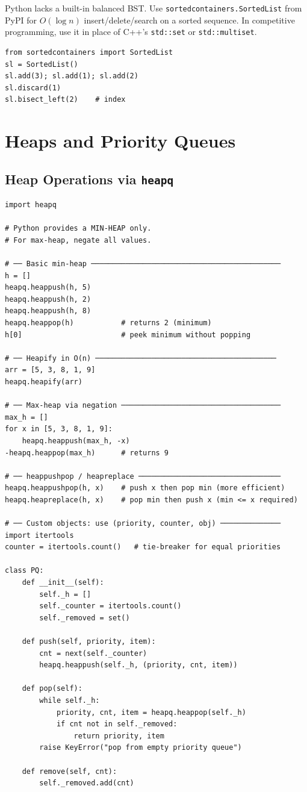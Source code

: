 \documentclass[11pt,a4paper]{report}
\begin{document}
\begin{tipbox}
Python lacks a built-in balanced BST. Use \texttt{sortedcontainers.SortedList} from PyPI for $O(\log n)$ insert/delete/search on a sorted sequence. In competitive programming, use it in place of C++'s \texttt{std::set} or \texttt{std::multiset}.
\begin{lstlisting}
from sortedcontainers import SortedList
sl = SortedList()
sl.add(3); sl.add(1); sl.add(2)
sl.discard(1)
sl.bisect_left(2)    # index
\end{lstlisting}
\end{tipbox}

\chapter{Heaps and Priority Queues}

\section{Heap Operations via \texttt{heapq}}

\begin{lstlisting}
import heapq

# Python provides a MIN-HEAP only.
# For max-heap, negate all values.

# ── Basic min-heap ────────────────────────────────────────────
h = []
heapq.heappush(h, 5)
heapq.heappush(h, 2)
heapq.heappush(h, 8)
heapq.heappop(h)           # returns 2 (minimum)
h[0]                       # peek minimum without popping

# ── Heapify in O(n) ──────────────────────────────────────────
arr = [5, 3, 8, 1, 9]
heapq.heapify(arr)

# ── Max-heap via negation ─────────────────────────────────────
max_h = []
for x in [5, 3, 8, 1, 9]:
    heapq.heappush(max_h, -x)
-heapq.heappop(max_h)      # returns 9

# ── heappushpop / heapreplace ─────────────────────────────────
heapq.heappushpop(h, x)    # push x then pop min (more efficient)
heapq.heapreplace(h, x)    # pop min then push x (min <= x required)

# ── Custom objects: use (priority, counter, obj) ──────────────
import itertools
counter = itertools.count()   # tie-breaker for equal priorities

class PQ:
    def __init__(self):
        self._h = []
        self._counter = itertools.count()
        self._removed = set()

    def push(self, priority, item):
        cnt = next(self._counter)
        heapq.heappush(self._h, (priority, cnt, item))

    def pop(self):
        while self._h:
            priority, cnt, item = heapq.heappop(self._h)
            if cnt not in self._removed:
                return priority, item
        raise KeyError("pop from empty priority queue")

    def remove(self, cnt):
        self._removed.add(cnt)
\end{lstlisting}
\end{document}

